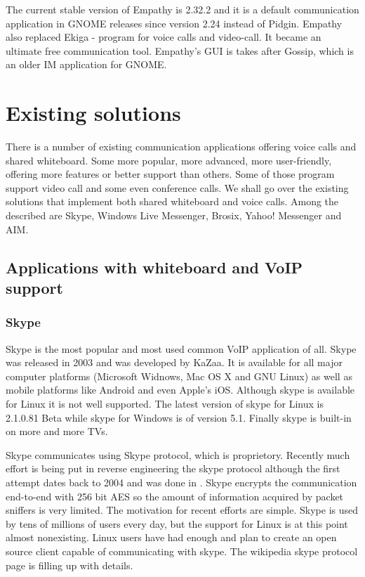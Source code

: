 The current stable version of Empathy is 2.32.2 and it is a default communication application in GNOME releases since version 2.24 instead of Pidgin. Empathy also replaced Ekiga - program for voice calls and video-call. It became an ultimate free communication tool. Empathy's GUI is takes after Gossip, which is an older IM application for GNOME. 


\chapter{Existing solutions}

There is a number of existing communication applications offering voice calls and shared whiteboard. Some more popular, more advanced, more user-friendly, offering more features or better support than others. Some of those program support video call and some even conference calls. We shall go over the existing solutions that implement both shared whiteboard and voice calls. Among the described are Skype\cite{skype}, Windows Live Messenger\cite{WindowsLiveMessenger}, Brosix\cite{brosix}, Yahoo! Messenger\cite{yahoo} and AIM\cite{AIM}.

\section{Applications with whiteboard and VoIP support}
\subsection*{Skype}
Skype is the most popular and most used common VoIP application of all. Skype was released in 2003 and was developed by KaZaa\cite{kazaa}. It is available for all major computer platforms (Microsoft Widnows, Mac OS X and GNU Linux) as well as mobile platforms like Android and even Apple's iOS. Although skype is available for Linux it is not well supported. The latest version of skype for Linux is 2.1.0.81 Beta while skype for Windows is of version 5.1. Finally skype is built-in on more and more TVs.

Skype communicates using Skype protocol, which is proprietory. Recently much effort is being put in reverse engineering the skype protocol although the first attempt dates back to 2004 and was done in \cite{skypeProtocolAnalysis}. Skype encrypts the communication end-to-end with 256 bit AES so the amount of information acquired by packet sniffers is very limited. The motivation for recent efforts are simple. Skype is used by tens of millions of users every day, but the support for Linux is at this point almost nonexisting. Linux users have had enough and plan to create an open source client capable of communicating with skype. The wikipedia skype protocol page\cite{wikipediaSkypeProtocol} is filling up with details.  

